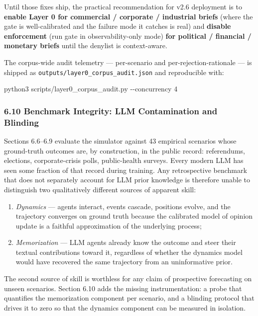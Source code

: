 \documentclass[
]{article}
\newenvironment{Shaded}{}{}
\newcommand{\AttributeTok}[1]{\textcolor[rgb]{0.49,0.56,0.16}{#1}}
\newcommand{\ExtensionTok}[1]{#1}
\newcommand{\NormalTok}[1]{#1}
\providecommand{\tightlist}{%
  \setlength{\itemsep}{0pt}\setlength{\parskip}{0pt}}
\begin{document}
Until those fixes ship, the practical recommendation for v2.6 deployment
is to \textbf{enable Layer 0 for commercial / corporate / industrial
briefs} (where the gate is well-calibrated and the failure mode it
catches is real) and \textbf{disable enforcement} (run gate in
observability-only mode) \textbf{for political / financial / monetary
briefs} until the denylist is context-aware.

The corpus-wide audit telemetry --- per-scenario and
per-rejection-rationale --- is shipped as
\texttt{outputs/layer0\_corpus\_audit.json} and reproducible with:

\begin{Shaded}
\begin{Highlighting}[]
\ExtensionTok{python3}\NormalTok{ scripts/layer0\_corpus\_audit.py }\AttributeTok{{-}{-}concurrency}\NormalTok{ 4}
\end{Highlighting}
\end{Shaded}

\subsubsection{6.10 Benchmark Integrity: LLM Contamination and
Blinding}\label{benchmark-integrity-llm-contamination-and-blinding}

Sections 6.6--6.9 evaluate the simulator against 43 empirical scenarios
whose ground-truth outcomes are, by construction, in the public record:
referendums, elections, corporate-crisis polls, public-health surveys.
Every modern LLM has seen some fraction of that record during training.
Any retrospective benchmark that does not separately account for LLM
prior knowledge is therefore unable to distinguish two qualitatively
different sources of apparent skill:

\begin{enumerate}
\def\labelenumi{\arabic{enumi}.}
\tightlist
\item
  \emph{Dynamics} --- agents interact, events cascade, positions evolve,
  and the trajectory converges on ground truth because the calibrated
  model of opinion update is a faithful approximation of the underlying
  process;
\item
  \emph{Memorization} --- LLM agents already know the outcome and steer
  their textual contributions toward it, regardless of whether the
  dynamics model would have recovered the same trajectory from an
  uninformative prior.
\end{enumerate}

The second source of skill is worthless for any claim of prospective
forecasting on unseen scenarios. Section 6.10 adds the missing
instrumentation: a probe that quantifies the memorization component per
scenario, and a blinding protocol that drives it to zero so that the
dynamics component can be measured in isolation.
\end{document}
